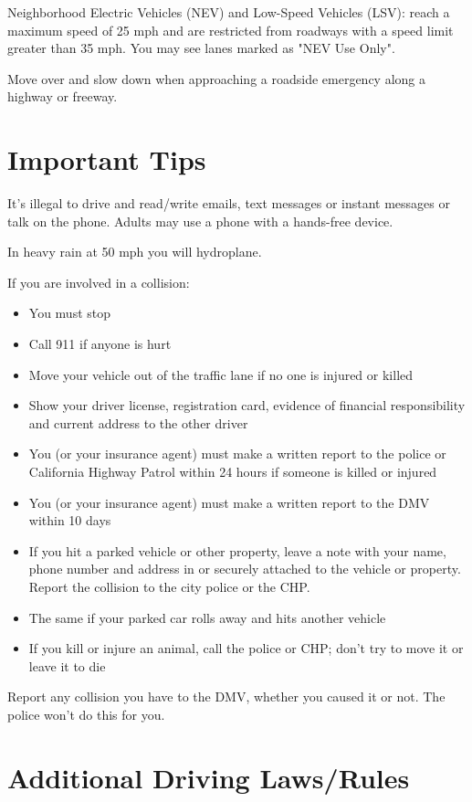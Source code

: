 Neighborhood Electric Vehicles (NEV) and Low-Speed Vehicles (LSV):
reach a maximum speed of 25 mph
and are restricted from roadways with a speed limit greater than 35 mph.
You may see lanes marked as "NEV Use Only".

Move over and slow down when approaching a roadside emergency
along a highway or freeway.


\section{Important Tips}

It's illegal to drive and read/write emails, text messages or instant messages
or talk on the phone.
Adults may use a phone with a hands-free device.

In heavy rain at 50 mph you will hydroplane.

If you are involved in a collision:
\begin{itemize}
\item You must stop
\item Call 911 if anyone is hurt
\item Move your vehicle out of the traffic lane if no one is injured or killed
\item Show your driver license, registration card,
evidence of financial responsibility and current address to the other driver
\item You (or your insurance agent) must make a written report to the police
or California Highway Patrol within 24 hours if someone is killed or injured
\item You (or your insurance agent)
must make a written report to the DMV within 10 days
\item If you hit a parked vehicle or other property,
leave a note with your name, phone number and address
in or securely attached to the vehicle or property.
Report the collision to the city police or the CHP.
\item The same if your parked car rolls away and hits another vehicle
\item If you kill or injure an animal, call the police or CHP;
don't try to move it or leave it to die
\end{itemize}

Report any collision you have to the DMV, whether you caused it or not.
The police won't do this for you.


\section{Additional Driving Laws/Rules}

